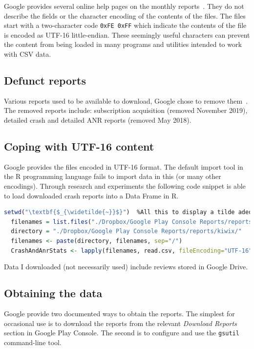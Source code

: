 Google provides several online help pages on the monthly reports~\citep{google_play_download_and_export_monthly_reports}. They do not describe the fields or the character encoding of the contents of the files. The files start with a two-character code \texttt{0xFE 0xFF} which indicate the contents of the file is encoded as UTF-16 little-endian. These seemingly useful characters can prevent the content from being loaded in many programs and utilities intended to work with CSV data.

\subsection{Defunct reports}
Various reports used to be available to download, Google chose to remove them~\citep{google_play_download_and_export_monthly_reports}. The removed reports include: subscription acquisition (removed November 2019), detailed crash and detailed ANR reports (removed May 2018).

\subsection{Coping with UTF-16 content}
Google provides the files encoded in UTF-16 format. The default import tool in the R programming language fails to import data in this (or many other encodings). Through research and experiments the following code snippet is able to load downloaded crash reports into a Data Frame in R.

\begin{lstlisting}[language=R, caption=Processing UTF-16 contents using R, label=listing=processing-utf-16-contents-in-r]
  setwd("\textbf{$_{\widetilde{~}}$}")  %All this to display a tilde adequately.
  filenames = list.files("./Dropbox/Google Play Console Reports/reports/kiwix/", pattern = ".csv")
  directory = "./Dropbox/Google Play Console Reports/reports/kiwix/"
  filenames <- paste(directory, filenames, sep="/")
  CrashAndAnrStats <- lapply(filenames, read.csv, fileEncoding="UTF-16")
\end{lstlisting}

Data I downloaded (not necessarily used) include reviews stored in Google Drive.

\subsection{Obtaining the data}
Google provide two documented ways to obtain the reports. The simplest for occasional use is to download the reports from the relevant \emph{Download Reports} section in Google Play Console. The second is to configure and use the \texttt{gsutil} command-line tool.

